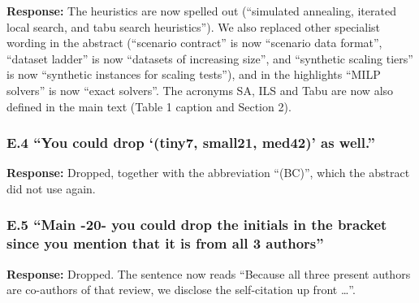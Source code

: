 \textbf{Response:} The heuristics are now spelled out (``simulated
annealing, iterated local search, and tabu search heuristics''). We also
replaced other specialist wording in the abstract (``scenario contract''
is now ``scenario data format'', ``dataset ladder'' is now ``datasets of
increasing size'', and ``synthetic scaling tiers'' is now ``synthetic
instances for scaling tests''), and in the highlights ``MILP solvers''
is now ``exact solvers''. The acronyms SA, ILS and Tabu are now also
defined in the main text (Table 1 caption and Section 2).

\subsubsection*{E.4 ``You could drop `(tiny7, small21, med42)' as
well.''}\label{e.4-you-could-drop-tiny7-small21-med42-as-well.}

\textbf{Response:} Dropped, together with the abbreviation ``(BC)'',
which the abstract did not use again.

\subsubsection*{E.5 ``Main -20- you could drop the initials in the
bracket since you mention that it is from all 3
authors''}\label{e.5-main--20--you-could-drop-the-initials-in-the-bracket-since-you-mention-that-it-is-from-all-3-authors}

\textbf{Response:} Dropped. The sentence now reads ``Because all three
present authors are co-authors of that review, we disclose the
self-citation up front \ldots{}''.
